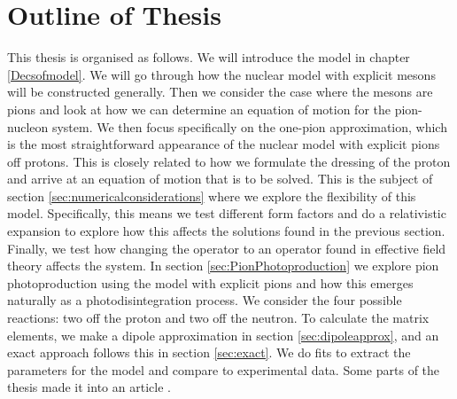 \section{Outline of Thesis}
This thesis is organised as follows. We will introduce the model in chapter \ref{Decsofmodel}. We will go through how the nuclear model with explicit mesons will be constructed generally. Then we consider the case where the mesons are pions and look at how we can determine an equation of motion for the pion-nucleon system. We then focus specifically on the one-pion approximation, which is the most straightforward appearance of the nuclear model with explicit pions off protons. This is closely related to how we formulate the dressing of the proton and arrive at an equation of motion that is to be solved. This is the subject of section \ref{sec:numericalconsiderations} where we explore the flexibility of this model. Specifically, this means we test different form factors and do a relativistic expansion to explore how this affects the solutions found in the previous section. Finally, we test how changing the operator to an operator found in effective field theory affects the system. In section \ref{sec:PionPhotoproduction} we explore pion photoproduction using the model with explicit pions and how this emerges naturally as a photodisintegration process. We consider the four possible reactions: two off the proton and two off the neutron. To calculate the matrix elements, we make a dipole approximation in section \ref{sec:dipoleapprox}, and an exact approach follows this in section \ref{sec:exact}. We do fits to extract the parameters for the model and compare to experimental data. Some parts of the thesis made it into an article \cite{ThresholdPion}.
